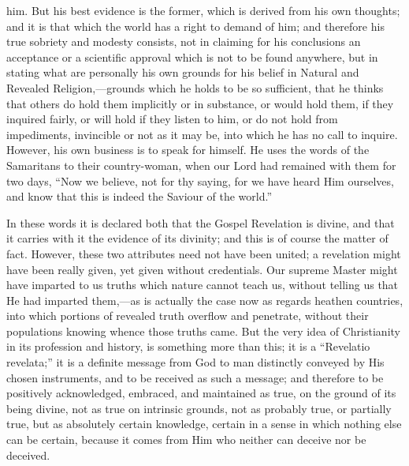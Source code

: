 him. But his best evidence is the former, which is derived from his
own thoughts; and it is that which the world has a right to demand
of him; and therefore his true sobriety and modesty consists, not in
claiming for his conclusions an acceptance or a scientific approval
which is not to be found anywhere, but in stating what are personally
his own grounds for his belief in Natural and Revealed Religion,—grounds
which he holds to be so sufficient, that he thinks that others do hold
them implicitly or in substance, or would hold them, if they inquired
fairly, or will hold if they listen to him, or do not hold from
impediments, invincible or not as it may be, into which he has no call
to inquire. However, his own business is to speak for himself. He uses
the words of the Samaritans to their country-woman, when our Lord had
remained with them for two days, ``Now we believe, not for thy
saying, for we have heard Him ourselves, and know that this is indeed
the Saviour of the world.''

In these words it is declared both that the Gospel Revelation is
divine, and that it carries with it the evidence of its divinity; and
this is of course the matter of fact. However, these two attributes
need not have been united; a revelation might have been really given,
yet given without credentials. Our supreme Master might have imparted
to us truths which nature cannot teach us, without telling us that He
had imparted them,—as is actually the case now as regards heathen
countries, into which portions of revealed truth overflow and
penetrate, without their populations knowing whence those truths came.
But the very idea of Christianity in its profession and history,
is something more than this; it is a ``Revelatio revelata;''
it is a definite message from God to man distinctly conveyed by His
chosen instruments, and to be received as such a message; and
therefore to be positively acknowledged, embraced, and maintained as
true, on the ground of its being divine, not as true on intrinsic
grounds, not as probably true, or partially true, but as absolutely
certain knowledge, certain in a sense in which nothing else can be
certain, because it comes from Him who neither can deceive nor be
deceived.

